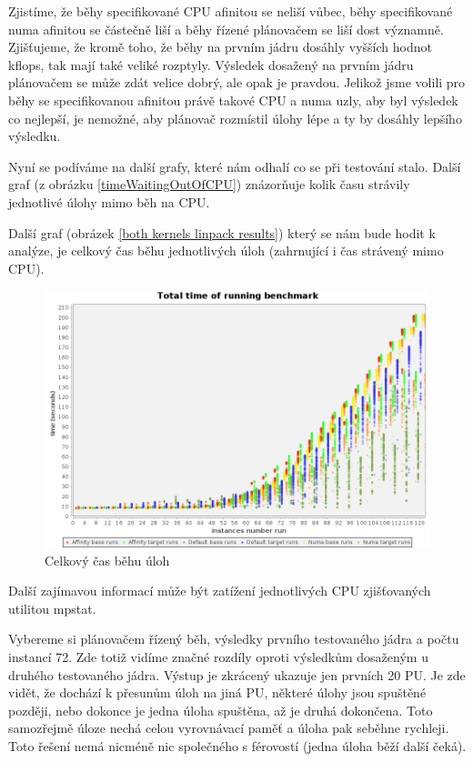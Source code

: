 \documentclass[
  field=ainfk,
  biblatex,
  glossaries,
  index
]{kidiplom}
\begin{document}
Zjistíme, že běhy specifikované CPU afinitou se neliší vůbec, běhy specifikované numa afinitou se částečně liší a běhy řízené plánovačem se liší dost významně. Zjišťujeme, že kromě toho, že běhy na prvním jádru dosáhly vyšších hodnot kflops, tak mají také veliké rozptyly. Výsledek dosažený na prvním jádru plánovačem se může zdát velice dobrý, ale opak je pravdou. Jelikož jsme volili pro běhy se specifikovanou afinitou právě takové CPU a numa uzly, aby byl výsledek co nejlepší, je nemožné, aby plánovač rozmístil úlohy lépe a ty by dosáhly lepšího výsledku. 


Nyní se podíváme na další grafy, které nám odhalí co se při testování stalo. Další graf (z obrázku \ref{timeWaitingOutOfCPU}) znázorňuje kolik času strávily jednotlivé úlohy mimo běh na CPU.

\newpage
Další graf (obrázek \ref{both kernels linpack results}) který se nám bude hodit k analýze, je celkový čas běhu jednotlivých úloh (zahrnující i čas strávený mimo CPU).

\begin{figure}[ht]
\center
\includegraphics[scale=0.32]{obrazky/totalTime.png}
\caption{Celkový čas běhu úloh}
\label{total time}
\end{figure}

Další zajímavou informací může být zatížení jednotlivých CPU zjišťovaných utilitou mpstat.

Vybereme si plánovačem řízený běh, výsledky prvního testovaného jádra a počtu instancí 72. Zde totiž vidíme značné rozdíly oproti výsledkům dosaženým u druhého testovaného jádra. Výstup je zkrácený ukazuje jen prvních 20 PU. Je zde vidět, že dochází k přesunům úloh na jiná PU, některé úlohy jsou spuštěné později, nebo dokonce je jedna úloha spuštěna, až je druhá dokončena. Toto samozřejmě úloze nechá celou vyrovnávací paměť a úloha pak seběhne rychleji. Toto řešení nemá nicméně nic společného s férovostí (jedna úloha běží další čeká).
\end{document}
